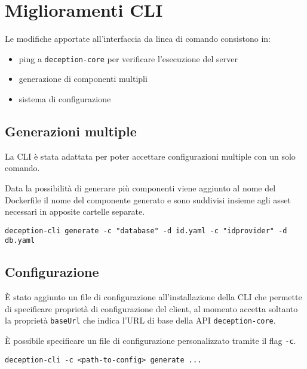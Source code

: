\section{Miglioramenti CLI}

Le modifiche apportate all'interfaccia da linea di comando consistono in:
\begin{itemize}
    \item ping a \texttt{deception-core} per verificare l'esecuzione del server
    \item generazione di componenti multipli
    \item sistema di configurazione
\end{itemize}

\subsection{Generazioni multiple}

La CLI è stata adattata per poter accettare configurazioni multiple con un solo comando.

Data la possibilità di generare più componenti viene aggiunto al nome del Dockerfile il nome del componente generato e sono suddivisi insieme agli asset necessari in apposite cartelle separate.

\begin{verbatim}
deception-cli generate -c "database" -d id.yaml -c "idprovider" -d db.yaml
\end{verbatim}

\subsection{Configurazione}

\`E stato aggiunto un file di configurazione all'installazione della CLI che permette di specificare proprietà di configurazione del client, al momento accetta soltanto la proprietà \texttt{baseUrl} che indica l'URL di base della API \texttt{deception-core}.

\`E possibile specificare un file di configurazione personalizzato tramite il flag \texttt{-c}.

\begin{verbatim}
deception-cli -c <path-to-config> generate ...
\end{verbatim}




